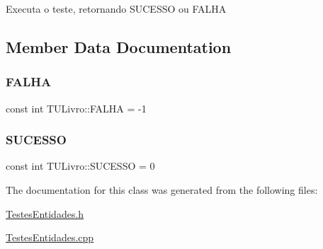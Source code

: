 Executa o teste, retornando S\+U\+C\+E\+S\+SO ou F\+A\+L\+HA 

\subsection{Member Data Documentation}
\mbox{\label{class_t_u_livro_a15c83153ff3decb1066d41d50c7429c6}} 
\subsubsection{\texorpdfstring{F\+A\+L\+HA}{FALHA}}
{\footnotesize\ttfamily const int T\+U\+Livro\+::\+F\+A\+L\+HA = -\/1\hspace{0.3cm}{\ttfamily [static]}}

\mbox{\label{class_t_u_livro_a9f66d4598c6c74fea2b06b77e0e1e340}} 
\subsubsection{\texorpdfstring{S\+U\+C\+E\+S\+SO}{SUCESSO}}
{\footnotesize\ttfamily const int T\+U\+Livro\+::\+S\+U\+C\+E\+S\+SO = 0\hspace{0.3cm}{\ttfamily [static]}}



The documentation for this class was generated from the following files\+:\begin{DoxyCompactItemize}
\item 
\hyperlink{_testes_entidades_8h}{Testes\+Entidades.\+h}\item 
\hyperlink{_testes_entidades_8cpp}{Testes\+Entidades.\+cpp}\end{DoxyCompactItemize}
